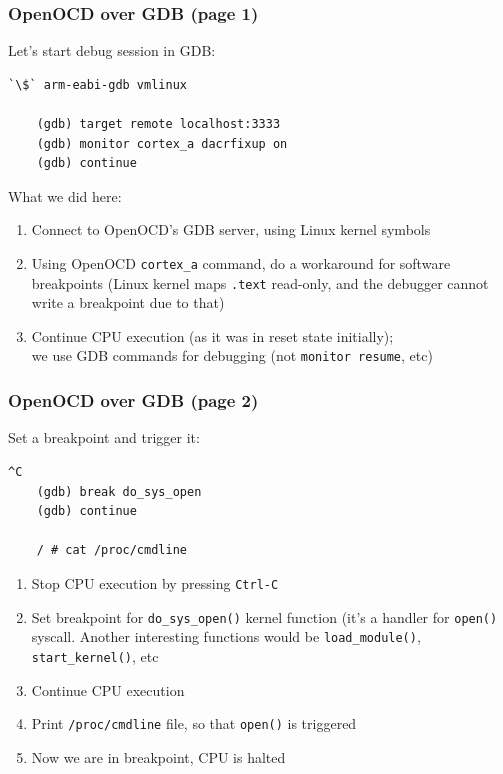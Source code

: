 \documentclass[aspectratio=169,usenames,dvipsnames]{beamer}
\newcounter{cont}
\begin{document}
\begin{frame}[containsverbatim]
  \frametitle{OpenOCD over GDB (page 1)}
  Let's start debug session in GDB:
  \begin{lstlisting}[numbers=none]
    `\$` arm-eabi-gdb vmlinux

    (gdb) target remote localhost:3333
    (gdb) monitor cortex_a dacrfixup on
    (gdb) continue
  \end{lstlisting}
  What we did here:
  \begin{enumerate}
    \item Connect to OpenOCD's GDB server, using Linux kernel symbols
    \item Using OpenOCD \texttt{cortex\_a} command, do a workaround for software
          breakpoints (Linux kernel maps \texttt{.text} read-only, and the
          debugger cannot write a breakpoint due to that)
    \item Continue CPU execution (as it was in reset state initially);\\
          we use GDB commands for debugging (not \texttt{monitor resume}, etc)
  \end{enumerate}
\end{frame}

\begin{frame}[containsverbatim]
  \frametitle{OpenOCD over GDB (page 2)}
  \vspace*{-5mm}
  Set a breakpoint and trigger it:
  \begin{lstlisting}[numbers=none]
    ^C
    (gdb) break do_sys_open
    (gdb) continue

    / # cat /proc/cmdline
  \end{lstlisting}
  \begin{enumerate}
    \item Stop CPU execution by pressing \texttt{Ctrl-C}
    \item Set breakpoint for \texttt{do\_sys\_open()} kernel function (it's a
          handler for \texttt{open()} syscall. Another interesting functions
          would be \texttt{load\_module()}, \texttt{start\_kernel()}, etc
    \item Continue CPU execution
    \item Print \texttt{/proc/cmdline} file, so that \texttt{open()} is
          triggered
    \item Now we are in breakpoint, CPU is halted
  \end{enumerate}
  \vspace*{-5mm}
\end{frame}
\end{document}

